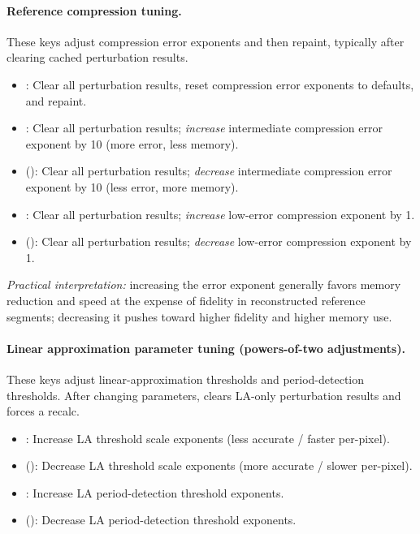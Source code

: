 \paragraph{Reference compression tuning.}
These keys adjust compression error exponents and then repaint, typically after
clearing cached perturbation results.
\begin{itemize}
  \item {}: Clear all perturbation results, reset compression error exponents to defaults,
        and repaint.
  \item {}: Clear all perturbation results; \emph{increase} intermediate compression error
        exponent by 10 (more error, less memory).
  \item {} (): Clear all perturbation results; \emph{decrease} intermediate compression
        error exponent by 10 (less error, more memory).
  \item {}: Clear all perturbation results; \emph{increase} low-error compression exponent by 1.
  \item {} (): Clear all perturbation results; \emph{decrease} low-error compression exponent by 1.
\end{itemize}
\emph{Practical interpretation:} increasing the error exponent generally favors
memory reduction and speed at the expense of fidelity in reconstructed reference
segments; decreasing it pushes toward higher fidelity and higher memory use.

\paragraph{Linear approximation parameter tuning (powers-of-two adjustments).}
These keys adjust linear-approximation thresholds and period-detection thresholds.
After changing parameters, \FractalShark{} clears LA-only perturbation results and
forces a recalc.
\begin{itemize}
  \item {}: Increase LA threshold scale exponents (less accurate / faster per-pixel).
  \item {} (): Decrease LA threshold scale exponents (more accurate / slower per-pixel).
  \item {}: Increase LA period-detection threshold exponents.
  \item {} (): Decrease LA period-detection threshold exponents.
\end{itemize}

